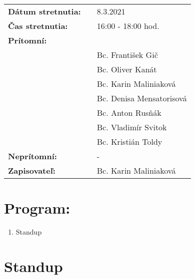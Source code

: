 \documentclass{article}
\begin{document}
    

    \begin{table}[h]
        \begin{tabular}{lllll}
            \multicolumn{3}{l}{\textbf{Dátum stretnutia:}} & & 8.3.2021 \\
            \multicolumn{3}{l}{\textbf{Čas stretnutia:}} & & 16:00 - 18:00 hod. \\
            \multicolumn{3}{l}{\textbf{Prítomní:}} \\
            & & & & Bc. František Gič  \\
            & & & & Bc. Oliver Kanát \\
            & & & & Bc. Karin Maliniaková \\
            & & & & Bc. Denisa Mensatorisová \\
            & & & & Bc. Anton Rusňák \\
            & & & & Bc. Vladimír Svitok \\
            & & & & Bc. Kristián Toldy \\
            \multicolumn{3}{l}{\textbf{Neprítomní:}} & & -\\
            \multicolumn{3}{l}{\textbf{Zapisovateľ:}} & & Bc. Karin Maliniaková \\
        \end{tabular}
        \label{tab:grades}
    \end{table}

    \section*{Program:}

    \begin{enumerate}
        \item Standup
    \end{enumerate}

    \section*{Standup}
\end{document}
